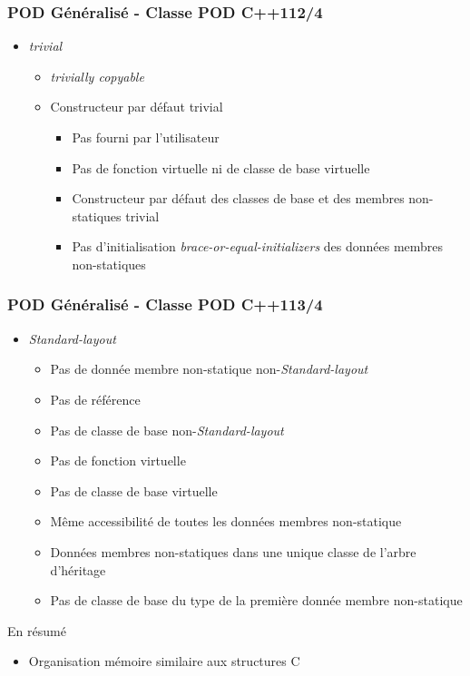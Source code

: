 \documentclass[C++.tex]{subfiles}
\begin{document}
\begin{frame}[fragile]
	\frametitle{POD Généralisé - Classe POD C++11\titlehfill{}2/4}
	\begin{itemize}
		\item \textit{trivial}
		\begin{itemize}
			\item \textit{trivially copyable}
			\item Constructeur par défaut trivial
			\begin{itemize}
				\item Pas fourni par l'utilisateur
				\item Pas de fonction virtuelle ni de classe de base virtuelle
				\item Constructeur par défaut des classes de base et des membres non-statiques trivial
				\item Pas d'initialisation \textit{brace-or-equal-initializers} des données membres non-statiques
			\end{itemize}
		\end{itemize}
	\end{itemize}
\end{frame}

\begin{frame}[fragile]
	\frametitle{POD Généralisé - Classe POD C++11\titlehfill{}3/4}
	\begin{itemize}
		\item \textit{Standard-layout}
		\begin{itemize}
			\item Pas de donnée membre non-statique non-\textit{Standard-layout} 
			\item Pas de référence
			\item Pas de classe de base non-\textit{Standard-layout}
			\item Pas de fonction virtuelle 
			\item Pas de classe de base virtuelle
			\item Même accessibilité de toutes les données membres non-statique
			\item Données membres non-statiques dans une unique classe de l'arbre d'héritage


			\item Pas de classe de base du type de la première donnée membre non-statique

		\end{itemize}
	\end{itemize}

	\pause

	\begin{block}{En résumé}
		\begin{itemize}
			\item Organisation mémoire similaire aux structures C
		\end{itemize}
	\end{block}
\end{frame}
\end{document}
